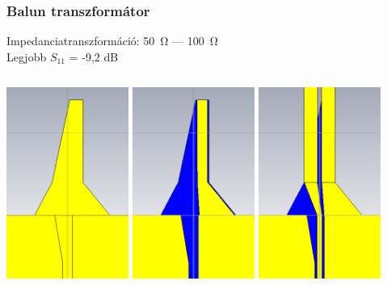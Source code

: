 \documentclass[aspectratio=169]{beamer}
\begin{document}
\begin{frame}
	\frametitle{Balun transzformátor}
		\centering
		Impedanciatranszformáció: \SI{50}{\ohm} --- \SI{100}{\ohm} \\
		Legjobb $S_{11}$ = -9,2 dB \\
		\vspace{\fill}
		\begin{columns}
				\centering
				\centering
				\includegraphics[width=0.3\textwidth]{balun_1.png}
				\includegraphics[width=0.3\textwidth]{balun_2.png}
				\includegraphics[width=0.3\textwidth]{balun_3.png}
				\centering
		\end{columns}
\end{frame}
\end{document}

